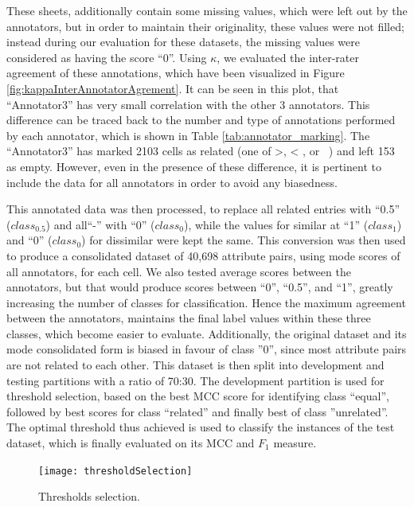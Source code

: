 \documentclass{ieeeaccess}
\begin{document}
These sheets, additionally contain some missing values, which were left out by the annotators, but in order to maintain their originality, these values were not filled; instead during our evaluation for these datasets, the missing values were considered as having the score ``0''. Using $\kappa$, we evaluated the inter-rater agreement of these annotations, which have been visualized in Figure \ref{fig:kappaInterAnnotatorAgrement}. It can be seen in this plot, that ``Annotator3'' has very small correlation with the other 3 annotators. This difference can be traced back to the number and type of annotations performed by each annotator, which is shown in Table \ref{tab:annotator_marking}. The ``Annotator3'' has marked 2103 cells as related (one of >, < , or ~) and left 153 as empty. However, even in the presence of these difference, it is pertinent to include the data for all annotators in order to avoid any biasedness. 

This annotated data was then processed, to replace all related entries with ``0.5'' ($class_{0.5}$) and all``-'' with ``0'' ($class_{0}$), while the values for similar at ``1'' ($class_{1}$) and ``0'' ($class_{0}$) for dissimilar were kept the same. This conversion was then used to produce a consolidated dataset of 40,698 attribute pairs, using mode scores of all annotators, for each cell. We also tested average scores between the annotators, but that would produce scores between ``0'', ``0.5'', and ``1'', greatly increasing the number of classes for classification. Hence the maximum agreement between the annotators, maintains the final label values within these three classes, which become easier to evaluate. Additionally, the original dataset and its mode consolidated form is biased in favour of class ''0'', since most attribute pairs are not related to each other.
This dataset is then split into development and testing partitions with a ratio of 70:30. The development partition is used for threshold selection, based on the best MCC score for identifying class ``equal'', followed by best scores for class ``related'' and finally best of class ''unrelated''. The optimal threshold thus achieved is used to classify the instances of the test dataset, which is finally evaluated on its MCC and $F_1$ measure.

\begin{figure}[t!]
	\centering
	\texttt{[image: thresholdSelection]}
	\caption{Thresholds selection.}
	\label{fig:thresholdSelection}
\end{figure}
\end{document}
